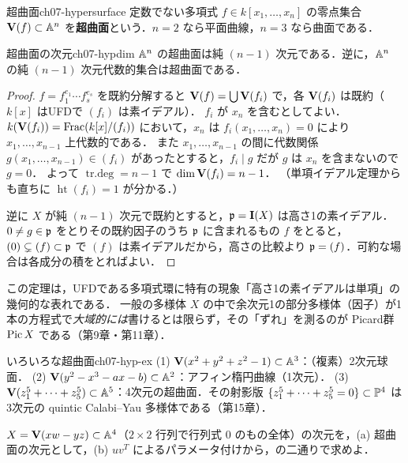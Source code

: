 \begin{mydef}{超曲面}{ch07-hypersurface}
定数でない多項式 $f\in k[x_1,\dots,x_n]$ の零点集合 $\mathbf{V}(f)\subset\mathbb{A}^n$ を\textbf{超曲面}という．$n=2$ なら平面曲線，$n=3$ なら曲面である．
\end{mydef}

\begin{mythm}{超曲面の次元}{ch07-hypdim}
$\mathbb{A}^n$ の超曲面は純 $(n-1)$ 次元である．逆に，$\mathbb{A}^n$ の純 $(n-1)$ 次元代数的集合は超曲面である．
\end{mythm}

\begin{proof}
$f=f_1^{e_1}\cdots f_s^{e_s}$ を既約分解すると $\mathbf{V}(f)=\bigcup\mathbf{V}(f_i)$ で，各 $\mathbf{V}(f_i)$ は既約（$k[x]$ はUFDで $(f_i)$ は素イデアル）．
$f_i$ が $x_n$ を含むとしてよい．$k(\mathbf{V}(f_i))=\operatorname{Frac}(k[x]/(f_i))$ において，$x_n$ は $f_i(x_1,\dots,x_n)=0$ により $x_1,\dots,x_{n-1}$ 上代数的である．
また $x_1,\dots,x_{n-1}$ の間に代数関係 $g(x_1,\dots,x_{n-1})\in(f_i)$ があったとすると，$f_i\mid g$ だが $g$ は $x_n$ を含まないので $g=0$．
よって $\mathop{\mathrm{tr.deg}}\nolimits=n-1$ で $\dim\mathbf{V}(f_i)=n-1$．
（単項イデアル定理からも直ちに $\operatorname{ht}(f_i)=1$ が分かる．）

逆に $X$ が純 $(n-1)$ 次元で既約とすると，$\mathfrak{p}=\mathbf{I}(X)$ は高さ1の素イデアル．$0\neq g\in\mathfrak{p}$ をとりその既約因子のうち $\mathfrak{p}$ に含まれるもの $f$ をとると，
$(0)\subsetneq(f)\subset\mathfrak{p}$ で $(f)$ は素イデアルだから，高さの比較より $\mathfrak{p}=(f)$．可約な場合は各成分の積をとればよい．
\end{proof}

この定理は，UFDである多項式環に特有の現象「高さ1の素イデアルは単項」の幾何的な表れである．
一般の多様体 $X$ の中で余次元1の部分多様体（因子）が1本の方程式で\emph{大域的には}書けるとは限らず，その「ずれ」を測るのが Picard群 $\operatorname{Pic} X$ である（第9章・第11章）．

\begin{myex}{いろいろな超曲面}{ch07-hyp-ex}
(1) $\mathbf{V}(x^2+y^2+z^2-1)\subset\mathbb{A}^3$：（複素）2次元球面．\quad
(2) $\mathbf{V}(y^2-x^3-ax-b)\subset\mathbb{A}^2$：アフィン楕円曲線（1次元）．\quad
(3) $\mathbf{V}(z_1^5+\cdots+z_5^5)\subset\mathbb{A}^5$：4次元の超曲面．その射影版 $\{z_1^5+\cdots+z_5^5=0\}\subset\mathbb{P}^4$ は3次元の quintic Calabi–Yau 多様体である（第15章）．
\end{myex}

$X=\mathbf{V}(xw-yz)\subset\mathbb{A}^4$（$2\times2$ 行列で行列式 $0$ のもの全体）の次元を，(a) 超曲面の次元として，(b) $u v^{T}$ によるパラメータ付けから，の二通りで求めよ．

